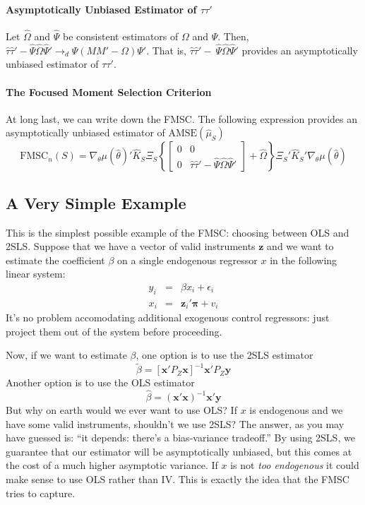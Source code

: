 \documentclass[12pt]{article}
\theoremstyle{definition}
\begin{document}
\paragraph{Asymptotically Unbiased Estimator of $\tau\tau'$}
Let $\widehat{\Omega}$ and $\widehat{\Psi}$ be consistent estimators of $\Omega$ and $\Psi$. Then, $ \widehat{\tau}\widehat{\tau}' - \widehat{\Psi}\widehat{\Omega}\widehat{\Psi}' \rightarrow_d\Psi \left(MM' - \Omega\right)\Psi' $. That is, $\widehat{\tau}\widehat{\tau}' - \ \widehat{\Psi}\widehat{\Omega}\widehat{\Psi}' $ provides an asymptotically unbiased estimator of $\tau\tau'$.

\paragraph{The Focused Moment Selection Criterion} At long last, we can write down the FMSC. The following expression provides an asymptotically unbiased estimator of $\mbox{AMSE}(\widehat{\mu}_S)$
$$\mbox{FMSC}_n(S) = \nabla_\theta\mu(\widehat{\theta})'\widehat{K}_S\Xi_S \left\{\left[\begin{array}{cc}0&0\\0&\widehat{\tau}\widehat{\tau}' - \widehat{\Psi}\widehat{\Omega}\widehat{\Psi}'\end{array}\right] + \widehat{\Omega}\right\}\Xi_S'\widehat{K}_S' \nabla_\theta\mu(\widehat{\theta})$$

\subsection{A Very Simple Example}
This is the simplest possible example of the FMSC: choosing between OLS and 2SLS. Suppose that we have a vector of valid instruments $\mathbf{z}$ and we want to estimate the coefficient $\beta$ on a single endogenous regressor $x$ in the following linear system:
    	\begin{eqnarray*}
			y_{i} &=& \beta x_{i}  + \epsilon_{i}\\
	x_{i} &=& \mathbf{z}_{i}' \boldsymbol{\pi} + v_{i}
		\end{eqnarray*}
It's no problem accomodating additional exogenous control regressors: just project them out of the system before proceeding. 

Now, if we want to estimate $\beta$, one option is to use the 2SLS estimator
	$$\widetilde{\beta} = \left[ \textbf{x}'P_Z\textbf{x}\right]^{-1}\textbf{x}'P_Z \textbf{y}$$
Another option is to use the OLS estimator
	$$\widehat{\beta} = \left(\textbf{x}'\textbf{x} \right)^{-1}\textbf{x}'\textbf{y}$$
But why on earth would we ever want to use OLS? If $x$ is endogenous and we have some valid instruments, shouldn't we use 2SLS? The answer, as you may have guessed is: ``it depends: there's a bias-variance tradeoff.'' By using 2SLS, we guarantee that our estimator will be asymptotically unbiased, but this comes at the cost of a much higher asymptotic variance. If $x$ is not \emph{too endogenous} it could make sense to use OLS rather than IV. This is exactly the idea that the FMSC tries to capture.
\end{document}
